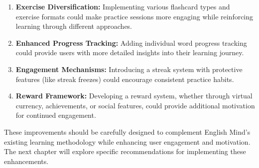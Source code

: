 \begin{enumerate}
    \item \textbf{Exercise Diversification:} Implementing various flashcard types and exercise formats could make practice sessions more engaging while reinforcing learning through different approaches.
    
    \item \textbf{Enhanced Progress Tracking:} Adding individual word progress tracking could provide users with more detailed insights into their learning journey.
    
    \item \textbf{Engagement Mechanisms:} Introducing a streak system with protective features (like streak freezes) could encourage consistent practice habits.
    
    \item \textbf{Reward Framework:} Developing a reward system, whether through virtual currency, achievements, or social features, could provide additional motivation for continued engagement.
\end{enumerate}

These improvements should be carefully designed to complement English Mind's existing learning methodology while enhancing user engagement and motivation. The next chapter will explore specific recommendations for implementing these enhancements.